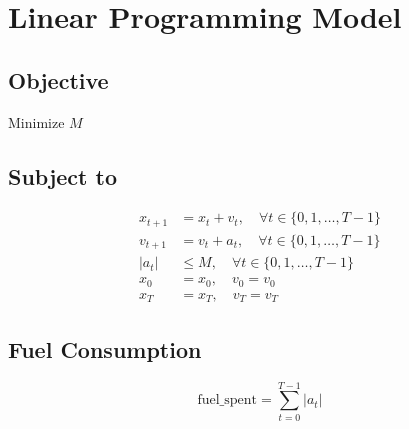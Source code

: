 \documentclass{article}
\begin{document}
\section*{Linear Programming Model}

\subsection*{Objective}
Minimize \( M \)

\subsection*{Subject to}
\begin{align*}
x_{t+1} &= x_t + v_t, \quad \forall t \in \{0, 1, \ldots, T-1\} \\
v_{t+1} &= v_t + a_t, \quad \forall t \in \{0, 1, \ldots, T-1\} \\
|a_t| &\leq M, \quad \forall t \in \{0, 1, \ldots, T-1\} \\
x_0 &= x_0, \quad v_0 = v_0 \\
x_T &= x_T, \quad v_T = v_T
\end{align*}

\subsection*{Fuel Consumption}
\[
\text{fuel\_spent} = \sum_{t=0}^{T-1} |a_t|
\]
\end{document}
